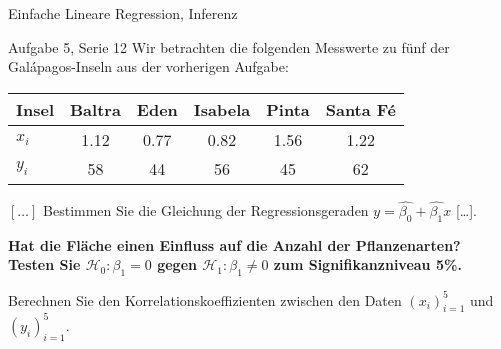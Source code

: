 \documentclass[handout]{beamer}
\begin{document}
\begin{frame}{Einfache Lineare Regression, Inferenz}
\begin{beamerboxesrounded}[shadow]{Aufgabe 5, Serie 12}
Wir betrachten die folgenden Messwerte zu fünf der Galápagos-Inseln aus der
vorherigen Aufgabe:

\begin{center}{\scriptsize\begin{tabular}{l|ccccc}\toprule
Insel & Baltra & Eden & Isabela & Pinta & Santa Fé\\\midrule
$x_i$&
 1.12 & 0.77 & 0.82 & 1.56 & 1.22\\
$y_i$&
  58 & 44 & 56 & 45 & 62\\
\bottomrule
\end{tabular}}\end{center}

\begin{outline}
\item $[\dots]$ Bestimmen Sie die Gleichung der Regressionsgeraden
$y=\hat{\beta_0}+\hat{\beta_1}x$ [\dots].
\item \textbf{Hat die Fläche einen Einfluss auf die Anzahl der Pflanzenarten?
Testen Sie $\mathcal{H}_0: \beta_1 = 0$ gegen $\mathcal{H}_1: \beta_1 \ne 0$
zum Signifikanzniveau 5\%.}
\item Berechnen Sie den Korrelationskoeffizienten zwischen den Daten
$(x_i)_{i=1}^5$ und $(y_i)_{i=1}^5$.
\end{outline}
\end{beamerboxesrounded}
\end{frame}

%
%
\end{document}
